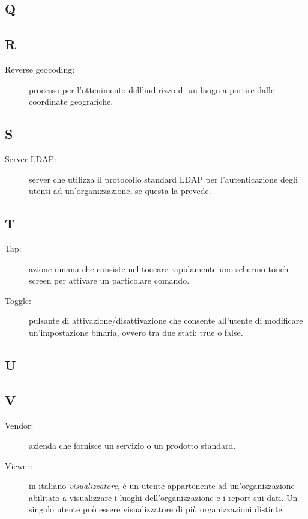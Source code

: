 \documentclass[../manuale-utente.tex]{subfiles}
\begin{document}
\subsection{Q}

\subsection{R}
\begin{description}
    \item[Reverse geocoding:] processo per l'ottenimento dell'indirizzo di un luogo a partire dalle coordinate geografiche.
\end{description}

\subsection{S}
\begin{description}
    \item[Server LDAP:] server che utilizza il protocollo standard LDAP per l'autenticazione degli utenti ad un'organizzazione, se questa la prevede.
\end{description}

\subsection{T}
\begin{description}
  \item[Tap:] azione umana che consiste nel toccare rapidamente uno schermo touch screen per attivare un particolare comando.
  \item[Toggle:] pulsante di attivazione/disattivazione che consente all'utente di modificare un'impostazione binaria, ovvero tra due stati: true o false.
\end{description}

\subsection{U}

\subsection{V}
\begin{description}
    \item[Vendor:] azienda che fornisce un servizio o un prodotto standard.
    \item[Viewer:] in italiano \textit{visualizzatore}, è un utente appartenente ad un'organizzazione abilitato a visualizzare i luoghi dell'organizzazione e i report sui dati. Un singolo utente può essere visualizzatore di più organizzazioni distinte.
\end{description}
\end{document}
